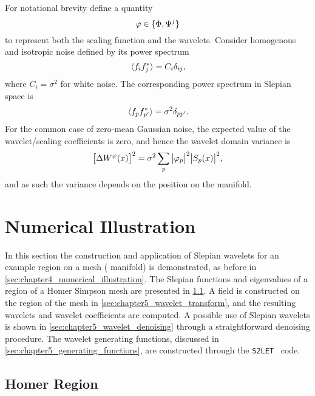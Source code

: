 For notational brevity define a quantity
%
\begin{equation}
	\varphi \in \set{\Phi,\Psi^{j}}
\end{equation}
%
to represent both the scaling function and the wavelets.
Consider homogenous and isotropic noise defined by its power spectrum
%
\begin{equation}
	\expval*{f_{i} \conj{f_{j}}}
	= C_{i} \delta_{i j},
\end{equation}
%
where \(C_{i} = \sigma^{2}\) for white noise.
The corresponding power spectrum in Slepian space is
%
\begin{equation}
	\expval*{\slepian{f} \conj{\slepian[']{f}}}
	= \sigma^{2} \delta_{pp'}.
\end{equation}
%
For the common case of zero-mean Gaussian noise, the expected value of the wavelet/scaling coefficients is zero, and hence the wavelet domain variance is
%
\begin{equation}
	\variance{\mesh{W^{\varphi}}}
	= \sigma^{2} \slepianSum \abs{\slepian{\varphi}}^{2} \abs{\mesh{\slepian{S}}}^{2},
\end{equation}
%
and as such the variance depends on the position on the manifold.

\section{Numerical Illustration}\label{sec:chapter5_numerical_illustration}

In this section the construction and application of Slepian wavelets for an example region on a mesh (\cf{} manifold) is demonstrated, as before in \cref{sec:chapter4_numerical_illustration}.
The Slepian functions and eigenvalues of a region of a Homer Simpson mesh are presented in \cref{sec:chapter5_homer_region}.
A field is constructed on the region of the mesh in \cref{sec:chapter5_wavelet_transform}, and the resulting wavelets and wavelet coefficients are computed.
A possible use of Slepian wavelets is shown in \cref{sec:chapter5_wavelet_denoising} through a straightforward denoising procedure.
The wavelet generating functions, discussed in \cref{sec:chapter5_generating_functions}, are constructed through the \texttt{S2LET}~\cite{Leistedt2013} code.

\subsection{Homer Region}\label{sec:chapter5_homer_region}

